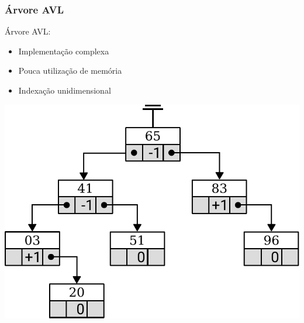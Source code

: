 \documentclass[10pt,xcolor=table,fleqn]{beamer}
\newcommand{\badpt}{{\color{defred} \DOWNarrow }}
\newcommand{\medpt}{{\color{defgray} \CIRCLE }}
\newcommand{\goodpt}{{\color{defgreen} \UParrow }}
\begin{document}
\begin{frame}
  \frametitle{Árvore AVL}
  Árvore AVL:\\
  \begin{itemize}
    \item{ Implementação complexa \badpt }
    \item{ Pouca utilização de memória \goodpt }
    \item{ Indexação unidimensional \medpt }
  \end{itemize}
  \pause
  \begin{center}
    \includegraphics[scale=0.4]{../img/kdt/avl-model}
  \end{center}
\end{frame}
\end{document}
